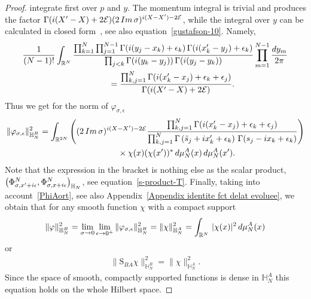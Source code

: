 \documentclass[11pt]{article}
\numberwithin{equation}{section}
\numberwithin{equation}{section}
\begin{document}
\begin{proof}
integrate first over $p$ and $y$. The momentum integral is trivial and produces the factor $\Gamma({\rm i}(X'-X)+2\mathcal E) (2
\mathop{\rm Im}\sigma)^{{\rm i}(X-X')-2\mathcal E}$, while the integral over $y$ can be calculated in
 closed form~\cite[Theorem 5.1]{MR1139492}, see also equation~\eqref{gustafson-10}. Namely,
\begin{gather}
\frac1{(N-1)!}\int_{\mathbb R^N}\frac{\prod_{k=1}^N\prod_{j=1}^{N-1} \Gamma({\rm i}(y_j-x_k)+\epsilon_k)\,\Gamma({\rm i}(x'_k-y_j)+\epsilon_k)}
{\prod_{j < k}\Gamma({\rm i}(y_k-y_j))\,\Gamma({\rm i}(y_j-y_k))}
\prod_{m=1}^{N-1} \frac{{\rm d}y_m}{2\pi}\nonumber
\\ \hphantom{\frac1{(N-1)!}}
{}=\frac{\prod_{k,j=1}^{N} \Gamma({\rm i}(x'_k-x_j)+\epsilon_k+\epsilon_j)}{\Gamma({\rm i}(X'-X)+2\mathcal E)}.\label{Gustafson-1}
\end{gather}
Thus we get for the norm of $\varphi_{\sigma,\epsilon}$
\begin{gather}
\|\varphi_{\sigma,\epsilon}\|^2_{\mathbb H_N^B} =\int_{\mathbb R^{2N}}
\left((2\mathop{\rm Im}\sigma)^{{\rm i}(X-X')-2\mathcal E}\frac{\prod_{k,j=1}^{N} \Gamma({\rm i}(x'_k-x_j)+\epsilon_k+\epsilon_j)}{\prod_{k,j=1}^{N}
\Gamma\left(\bar s_j+{\rm i}x'_k+\epsilon_k\right)\,\Gamma( s_j-{\rm i}x_k+\epsilon_k)}\right)\notag
\\ \hphantom{\|\varphi_{\sigma,\epsilon}\|^2_{\mathbb H_N^B} =}
{}\times \chi(x)(\chi(x'))^* \,{\rm d}\mu_N^A(x)\,{\rm d}\mu_N^A(x').\label{varphi_norm_final}
\end{gather}
Note that the expression in the bracket is nothing else as the scalar product,
$\big(\Phi^N_{\sigma,x'+{\rm i}\epsilon},\Phi^N_{\sigma,x+{\rm i}\epsilon}\big)_{ \mathbb H_N }$, see equation~\eqref{s-product-T}. Finally, taking into account~\eqref{PhiAort}, see also Appendix~\ref{Appendix identite fct delat evoluee}, we obtain that for any smooth function $\chi$ with a
compact support
\begin{gather*}
\|\varphi\|^2_{\mathbb H_N^B}=\lim_{\sigma\to 0}\lim_{\epsilon\to 0^+}\|\varphi_{\sigma,\epsilon}\|^2_{ \mathbb H_N^B }
=\|\chi\|^2_{\mathbb H_N^A} =\int_{\mathbb R^{N}}\, |\chi( x)|^2\,{\rm d}\mu_{N}^A(x)
\end{gather*}
or
\begin{gather*}
\|\mathrm S_{BA}\chi\|^2_{\mathbb H_N^B}=\|\chi\|^2_{\mathbb H_N^A}.
\end{gather*}
Since the space of smooth, compactly supported functions is dense in $\mathbb H_N^A$ this equation holds on the whole Hilbert space.
\end{proof}
\end{document}
